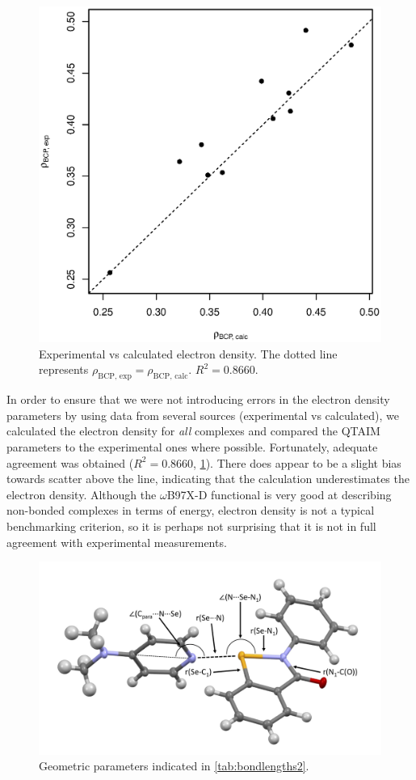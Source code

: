 \begin{refsection}
\begin{figure}
  \includegraphics[width=0.6\linewidth]{Figures/rho-agreement.eps}
  \caption[Experimental vs calculated electron density.]{Experimental vs calculated electron density. The dotted line represents $\rho_\text{BCP, exp} = \rho_\text{BCP, calc}$. $R^2 = 0.8660$.}\label{fig:qtaim-calc-exp}
\end{figure}

In order to ensure that we were not introducing errors in the electron density parameters by using data from several sources (experimental vs calculated), we calculated the electron density for \emph{all} complexes and compared the QTAIM parameters to the experimental ones where possible.
Fortunately, adequate agreement was obtained ($R^2 = 0.8660$, \cref{fig:qtaim-calc-exp}).
There does appear to be a slight bias towards scatter above the line, indicating that the calculation underestimates the electron density.
Although the $\omega$B97X-D functional is very good at describing non-bonded complexes in terms of energy, electron density is not a typical benchmarking criterion, so it is perhaps not surprising that it is not in full agreement with experimental measurements.


\begin{figure}
  \includegraphics[width=0.7\linewidth]{Figures/ebs-dmap-bondlengths.pdf}
  \caption{Geometric parameters indicated in \cref{tab:bondlengths2}.}\label{fig:ebs-dmap-bondlengths}
\end{figure}


\end{refsection}
